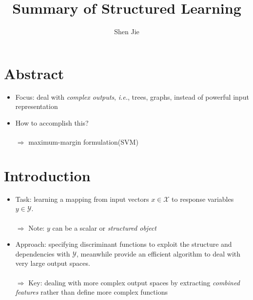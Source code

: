 \documentclass[12pt,a4paper,twoside]{article}
\author{Shen Jie}
\title{Summary of Structured Learning}
\begin{document}
\maketitle
\section{Abstract}
\begin{itemize}
\item Focus: deal with \emph{complex outputs}, \emph{i.e.}, trees, graphs, instead of
powerful input representation
\item How to accomplish this?\\
\quad\\
$\Longrightarrow$ maximum-margin formulation(SVM)
\end{itemize}
\section{Introduction}
\begin{itemize}
\item Task: learning a mapping from input vectors $x \in \mathcal{X}$ to
response variables $y \in \mathcal{Y}$.\\
\quad\\
$\Longrightarrow$ Note: $y$ can be a scalar or \emph{structured object}
\item Approach: specifying discriminant functions to exploit
the structure and dependencies with $\mathcal{Y}$, meanwhile
provide an efficient algorithm to deal with very large output
spaces.\\
\quad\\
$\Longrightarrow$ Key: dealing with more complex output spaces by
extracting \emph{combined features} rather than define more complex
functions
\end{itemize}
\end{document}
